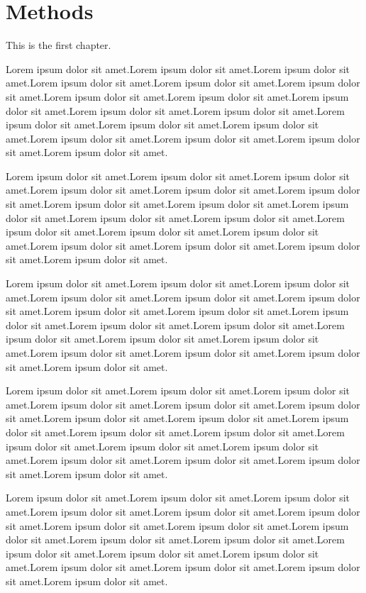 \documentclass[main.tex]{subfiles}
\begin{document}
\chapter{Methods}
This is the first chapter.

Lorem ipsum dolor sit amet.Lorem ipsum dolor sit amet.Lorem ipsum dolor sit amet.Lorem ipsum dolor sit amet.Lorem ipsum dolor sit amet.Lorem ipsum dolor sit amet.Lorem ipsum dolor sit amet.Lorem ipsum dolor sit amet.Lorem ipsum dolor sit amet.Lorem ipsum dolor sit amet.Lorem ipsum dolor sit amet.Lorem ipsum dolor sit amet.Lorem ipsum dolor sit amet.Lorem ipsum dolor sit amet.Lorem ipsum dolor sit amet.Lorem ipsum dolor sit amet.Lorem ipsum dolor sit amet.Lorem ipsum dolor sit amet.

Lorem ipsum dolor sit amet.Lorem ipsum dolor sit amet.Lorem ipsum dolor sit amet.Lorem ipsum dolor sit amet.Lorem ipsum dolor sit amet.Lorem ipsum dolor sit amet.Lorem ipsum dolor sit amet.Lorem ipsum dolor sit amet.Lorem ipsum dolor sit amet.Lorem ipsum dolor sit amet.Lorem ipsum dolor sit amet.Lorem ipsum dolor sit amet.Lorem ipsum dolor sit amet.Lorem ipsum dolor sit amet.Lorem ipsum dolor sit amet.Lorem ipsum dolor sit amet.Lorem ipsum dolor sit amet.Lorem ipsum dolor sit amet.

Lorem ipsum dolor sit amet.Lorem ipsum dolor sit amet.Lorem ipsum dolor sit amet.Lorem ipsum dolor sit amet.Lorem ipsum dolor sit amet.Lorem ipsum dolor sit amet.Lorem ipsum dolor sit amet.Lorem ipsum dolor sit amet.Lorem ipsum dolor sit amet.Lorem ipsum dolor sit amet.Lorem ipsum dolor sit amet.Lorem ipsum dolor sit amet.Lorem ipsum dolor sit amet.Lorem ipsum dolor sit amet.Lorem ipsum dolor sit amet.Lorem ipsum dolor sit amet.Lorem ipsum dolor sit amet.Lorem ipsum dolor sit amet.

Lorem ipsum dolor sit amet.Lorem ipsum dolor sit amet.Lorem ipsum dolor sit amet.Lorem ipsum dolor sit amet.Lorem ipsum dolor sit amet.Lorem ipsum dolor sit amet.Lorem ipsum dolor sit amet.Lorem ipsum dolor sit amet.Lorem ipsum dolor sit amet.Lorem ipsum dolor sit amet.Lorem ipsum dolor sit amet.Lorem ipsum dolor sit amet.Lorem ipsum dolor sit amet.Lorem ipsum dolor sit amet.Lorem ipsum dolor sit amet.Lorem ipsum dolor sit amet.Lorem ipsum dolor sit amet.Lorem ipsum dolor sit amet.

Lorem ipsum dolor sit amet.Lorem ipsum dolor sit amet.Lorem ipsum dolor sit amet.Lorem ipsum dolor sit amet.Lorem ipsum dolor sit amet.Lorem ipsum dolor sit amet.Lorem ipsum dolor sit amet.Lorem ipsum dolor sit amet.Lorem ipsum dolor sit amet.Lorem ipsum dolor sit amet.Lorem ipsum dolor sit amet.Lorem ipsum dolor sit amet.Lorem ipsum dolor sit amet.Lorem ipsum dolor sit amet.Lorem ipsum dolor sit amet.Lorem ipsum dolor sit amet.Lorem ipsum dolor sit amet.Lorem ipsum dolor sit amet.
\end{document}
